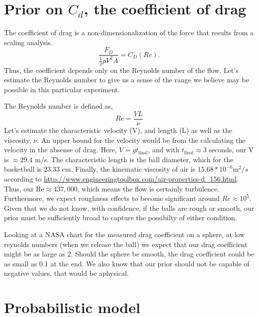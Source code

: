 \documentclass{article}
\begin{document}
\section{Prior on $C_d$, the coefficient of drag}

The coefficient of drag is a non-dimensionalization of the force that
results from a scaling analysis. 
\begin{equation*}
 \frac{F_D}{\frac{1}{2} \rho V^2 A } = C_D(Re).
\end{equation*}
Thus, the coefficient depends only on the Reynolds number of the
flow. Let's estimate the Reynolds number to give us a sense of the range 
we believe may be possible in this particular experiment. 

The Reynolds number is defined as, 
\begin{equation*}
 Re = \frac{V L}{\nu}
\end{equation*}
Let's estimate the characteristic velocity (V), and length (L) as well
as the viscosity, $\nu$. An upper bound for the velocity would be from
the calculating the velocity in the absense of drag. Here, $V = g
t_{\text{final}}$, and with $t_{\text{final}} \approx 3 $ seconds, our V
is $\approx 29.4 $ m/s. The characteristic length is the ball diameter,
which for the basketball is 23.33 cm. Finally, the kinematic viscosity
of air is $15.68 * 10^{-6} \text{m}^2/s$ according to
\url{http://www.engineeringtoolbox.com/air-properties-d_156.html}. Thus,
our $\text{Re} \approx 437,000$, which means the flow is certainly
turbulence. Furthermore, we expect roughness effects to become
significant around $Re \approx 10^5$. Given that we do not know, with
confidence, if the balls are rough or smooth, our prior must be
sufficiently broad to capture the possibilty of either condition. 

Looking at a NASA chart for the measured drag coefficient on a sphere, 
at low reynolds numbers (when we release the ball) we expect that our
drag coefficient might be as large as 2. Should the sphere be smooth,
the drag coefficient could be as small as 0.1 at the end. We also know
that our prior should not be capable of negative values, that would be
aphysical. 

\section{Probabilistic model}
\end{document}
